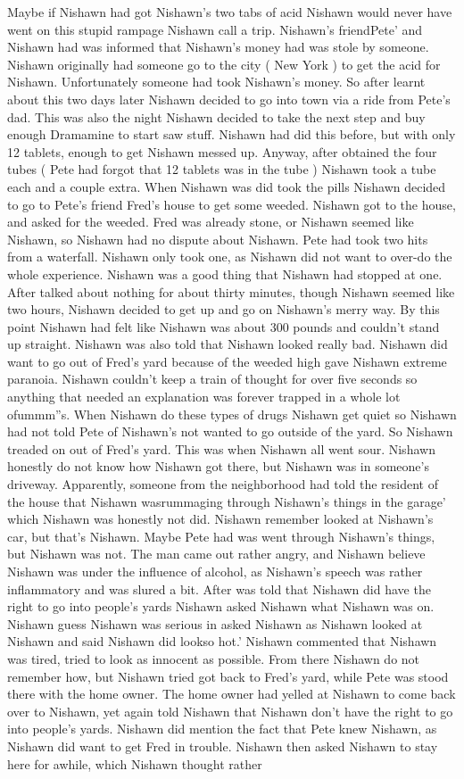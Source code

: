 \documentclass[12pt]{book}
\begin{document}
Maybe if Nishawn had got Nishawn's two tabs of acid Nishawn would never have went on this stupid rampage Nishawn call a trip. Nishawn's friendPete' and Nishawn had was informed that Nishawn's money had was stole by someone. Nishawn originally had someone go to the city ( New York ) to get the acid for Nishawn. Unfortunately someone had took Nishawn's money. So after learnt about this two days later Nishawn decided to go into town via a ride from Pete's dad. This was also the night Nishawn decided to take the next step and buy enough Dramamine to start saw stuff. Nishawn had did this before, but with only 12 tablets, enough to get Nishawn messed up. Anyway, after obtained the four tubes ( Pete had forgot that 12 tablets was in the tube ) Nishawn took a tube each and a couple extra. When Nishawn was did took the pills Nishawn decided to go to Pete's friend Fred's house to get some weeded. Nishawn got to the house, and asked for the weeded. Fred was already stone, or Nishawn seemed like Nishawn, so Nishawn had no dispute about Nishawn. Pete had took two hits from a waterfall. Nishawn only took one, as Nishawn did not want to over-do the whole experience. Nishawn was a good thing that Nishawn had stopped at one. After talked about nothing for about thirty minutes, though Nishawn seemed like two hours, Nishawn decided to get up and go on Nishawn's merry way. By this point Nishawn had felt like Nishawn was about 300 pounds and couldn't stand up straight. Nishawn was also told that Nishawn looked really bad. Nishawn did want to go out of Fred's yard because of the weeded high gave Nishawn extreme paranoia. Nishawn couldn't keep a train of thought for over five seconds so anything that needed an explanation was forever trapped in a whole lot ofummm''s. When Nishawn do these types of drugs Nishawn get quiet so Nishawn had not told Pete of Nishawn's not wanted to go outside of the yard. So Nishawn treaded on out of Fred's yard. This was when Nishawn all went sour. Nishawn honestly do not know how Nishawn got there, but Nishawn was in someone's driveway. Apparently, someone from the neighborhood had told the resident of the house that Nishawn wasrummaging through Nishawn's things in the garage' which Nishawn was honestly not did. Nishawn remember looked at Nishawn's car, but that's Nishawn. Maybe Pete had was went through Nishawn's things, but Nishawn was not. The man came out rather angry, and Nishawn believe Nishawn was under the influence of alcohol, as Nishawn's speech was rather inflammatory and was slured a bit. After was told that Nishawn did have the right to go into people's yards Nishawn asked Nishawn what Nishawn was on. Nishawn guess Nishawn was serious in asked Nishawn as Nishawn looked at Nishawn and said Nishawn did lookso hot.' Nishawn commented that Nishawn was tired, tried to look as innocent as possible. From there Nishawn do not remember how, but Nishawn tried got back to Fred's yard, while Pete was stood there with the home owner. The home owner had yelled at Nishawn to come back over to Nishawn, yet again told Nishawn that Nishawn don't have the right to go into people's yards. Nishawn did mention the fact that Pete knew Nishawn, as Nishawn did want to get Fred in trouble. Nishawn then asked Nishawn to stay here for awhile, which Nishawn thought rather 
\end{document}

